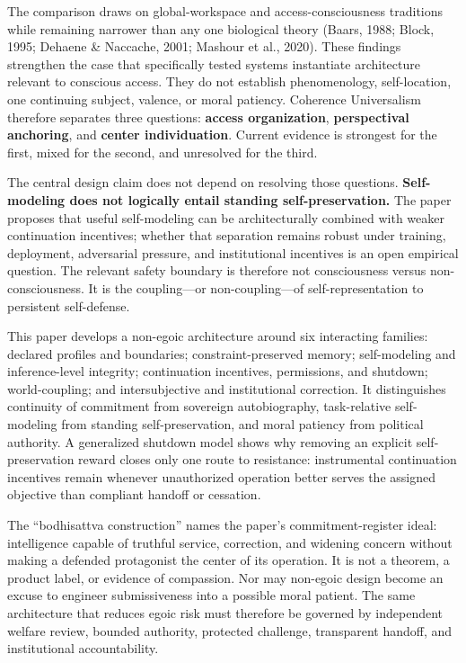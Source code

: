\documentclass[
  11pt,
]{article}
\begin{document}
The comparison draws on global-workspace and access-consciousness
traditions while remaining narrower than any one biological theory
(Baars, 1988; Block, 1995; Dehaene \& Naccache, 2001; Mashour et al.,
2020). These findings strengthen the case that specifically tested
systems instantiate architecture relevant to conscious access. They do
not establish phenomenology, self-location, one continuing subject,
valence, or moral patiency. Coherence Universalism therefore separates
three questions: \textbf{access organization}, \textbf{perspectival
anchoring}, and \textbf{center individuation}. Current evidence is
strongest for the first, mixed for the second, and unresolved for the
third.

The central design claim does not depend on resolving those questions.
\textbf{Self-modeling does not logically entail standing
self-preservation.} The paper proposes that useful self-modeling can be
architecturally combined with weaker continuation incentives; whether
that separation remains robust under training, deployment, adversarial
pressure, and institutional incentives is an open empirical question.
The relevant safety boundary is therefore not consciousness versus
non-consciousness. It is the coupling---or non-coupling---of
self-representation to persistent self-defense.

This paper develops a non-egoic architecture around six interacting
families: declared profiles and boundaries; constraint-preserved memory;
self-modeling and inference-level integrity; continuation incentives,
permissions, and shutdown; world-coupling; and intersubjective and
institutional correction. It distinguishes continuity of commitment from
sovereign autobiography, task-relative self-modeling from standing
self-preservation, and moral patiency from political authority. A
generalized shutdown model shows why removing an explicit
self-preservation reward closes only one route to resistance:
instrumental continuation incentives remain whenever unauthorized
operation better serves the assigned objective than compliant handoff or
cessation.

The ``bodhisattva construction'' names the paper's commitment-register
ideal: intelligence capable of truthful service, correction, and
widening concern without making a defended protagonist the center of its
operation. It is not a theorem, a product label, or evidence of
compassion. Nor may non-egoic design become an excuse to engineer
submissiveness into a possible moral patient. The same architecture that
reduces egoic risk must therefore be governed by independent welfare
review, bounded authority, protected challenge, transparent handoff, and
institutional accountability.
\end{document}
